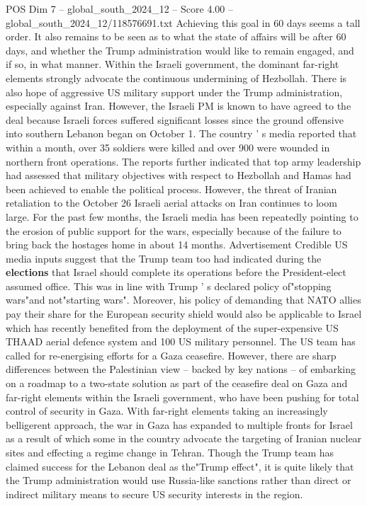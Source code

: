 \begin{textsample}{POS Dim 7 – global\_south\_2024\_12 – Score 4.00 – global\_south\_2024\_12/118576691.txt}
Achieving this goal in 60 days seems a tall order.
It also remains to be seen as to what the state of affairs will be after 60 days, and whether the Trump administration would like to remain engaged, and if so, in what manner.
Within the Israeli government, the dominant far-right elements strongly advocate the continuous undermining of Hezbollah.
There is also hope of aggressive US military support under the Trump administration, especially against Iran.
However, the Israeli PM is known to have agreed to the deal because Israeli forces suffered significant losses since the ground offensive into southern Lebanon began on October 1.
The country ' s media reported that within a month, over 35 soldiers were killed and over 900 were wounded in northern front operations.
The reports further indicated that top army leadership had assessed that military objectives with respect to Hezbollah and Hamas had been achieved to enable the political process.
However, the threat of Iranian retaliation to the October 26 Israeli aerial attacks on Iran continues to loom large.
For the past few months, the Israeli media has been repeatedly pointing to the erosion of public support for the wars, especially because of the failure to bring back the hostages home in about 14 months.
Advertisement Credible US media inputs suggest that the Trump team too had indicated during the \textbf{elections} that Israel should complete its operations before the President-elect assumed office.
This was in line with Trump ' s declared policy of"stopping wars"and not"starting wars".
Moreover, his policy of demanding that NATO allies pay their share for the European security shield would also be applicable to Israel which has recently benefited from the deployment of the super-expensive US THAAD aerial defence system and 100 US military personnel.
The US team has called for re-energising efforts for a Gaza ceasefire.
However, there are sharp differences between the Palestinian view -- backed by key nations -- of embarking on a roadmap to a two-state solution as part of the ceasefire deal on Gaza and far-right elements within the Israeli government, who have been pushing for total control of security in Gaza.
With far-right elements taking an increasingly belligerent approach, the war in Gaza has expanded to multiple fronts for Israel as a result of which some in the country advocate the targeting of Iranian nuclear sites and effecting a regime change in Tehran.
Though the Trump team has claimed success for the Lebanon deal as the"Trump effect", it is quite likely that the Trump administration would use Russia-like sanctions rather than direct or indirect military means to secure US security interests in the region.

\end{textsample}
